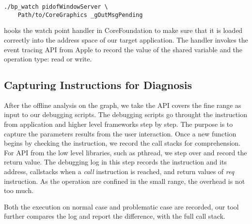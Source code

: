 \begin{BVerbatim}
./bp_watch pidofWindowServer \
	Path/to/CoreGraphics _gOutMsgPending
\end{BVerbatim}

\xxx hooks the watch point handler in CoreFoundation to make sure that it is
loaded correctly into the address space of our target application. The handler
invokes the event tracing API from Apple to record the value of the shared
variable and the operation type: read or write.

\subsection{Capturing Instructions for Diagnosis}


After the offline analysis on the graph, we take the API covers the fine range
as input to our debugging scripts.  The debugging scripts go throught the
instruction from application and higher level frameworks step by step.  The
purpose is to capture the parameters results from the user interaction.  Once a
new function begins by checking the instruction, we record the call stacks for
comprehension.  For API from the low level libraries, such as pthread, we step
over and record the return value. The debugging log in this step records the
instruction and its address, callstacks when a \textit{call} instruction is reached,
and return values of \textit{req} instruction. As the operation are confined in the
small range, the overhead is not too much.

Both the execution on normal case and problematic case are recorded, our tool
further compares the log and report the difference, with the full call stack.

